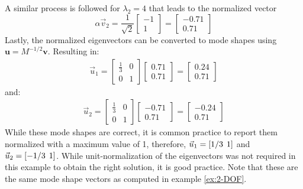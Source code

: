 \documentclass[12pt,letter]{article}
\begin{document}
\begin{example}
	A similar process is followed for $\lambda_2=4$ that leads to the normalized vector 
	\begin{equation}
	\alpha \vec{v}_2=  \frac{1}{\sqrt{2}} \begin{bmatrix} -1 \\ 1 \end{bmatrix} =  \begin{bmatrix} -0.71 \\ 0.71 \end{bmatrix} 
	\end{equation} 
	Lastly, the normalized eigenvectors can be converted to mode shapes using $\textbf{u} = M^{-1/2}\textbf{v}$. Resulting in: 
	\begin{eqnarray}
	\vec{u}_1 =  \begin{bmatrix} \frac{1}{3} & 0  \\  0 & 1 \end{bmatrix}   \begin{bmatrix} 0.71 \\ 0.71 \end{bmatrix} =  \begin{bmatrix} 0.24 \\  0.71 \end{bmatrix}
	\end{eqnarray}
	and:
	\begin{eqnarray}
	\vec{u}_2 =  \begin{bmatrix} \frac{1}{3} & 0  \\  0 & 1 \end{bmatrix}   \begin{bmatrix} -0.71 \\  0.71 \end{bmatrix} =  \begin{bmatrix} -0.24 \\  0.71 \end{bmatrix}
	\end{eqnarray}
	While these mode shapes are correct, it is common practice to report them normalized with a maximum value of 1, therefore, $\vec{u}_1 = [1/3 \hspace{1ex} 1]$ and $\vec{u}_2 = [-1/3 \hspace{1ex} 1]$. While unit-normalization of the eigenvectors was not required in this example to obtain the right solution, it is good practice. Note that these are the same mode shape vectors as computed in example \ref{ex:2-DOF}.
	
	\end{example}
	
\end{document}
